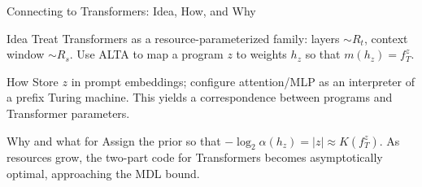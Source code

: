 \documentclass{beamer}
\begin{document}
\begin{frame}{Connecting to Transformers: Idea, How, and Why}
\small
\begin{block}{Idea}
Treat Transformers as a resource-parameterized family: layers $\sim R_t$, context window $\sim R_s$. Use ALTA to map a program $z$ to weights $h_z$ so that $m(h_z)=f^z_T$.
\end{block}

\begin{block}{How}
Store $z$ in prompt embeddings; configure attention/MLP as an interpreter of a prefix Turing machine. This yields a correspondence between programs and Transformer parameters.
\end{block}

\begin{block}{Why and what for}
Assign the prior so that $-\log_2\alpha(h_z)=|z|\approx K(f^z_T)$. As resources grow, the two-part code for Transformers becomes asymptotically optimal, approaching the MDL bound.
\end{block}
\end{frame}
\end{document}
